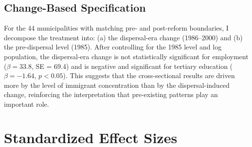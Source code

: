 \documentclass[12pt]{article}
\begin{document}
\subsection{Change-Based Specification}

For the 44 municipalities with matching pre- and post-reform boundaries, I decompose the treatment into: (a) the dispersal-era change (1986--2000) and (b) the pre-dispersal level (1985). After controlling for the 1985 level and log population, the dispersal-era change is not statistically significant for employment ($\beta = 33.8$, SE = 69.4) and is negative and significant for tertiary education ($\beta = -1.64$, $p < 0.05$). This suggests that the cross-sectional results are driven more by the level of immigrant concentration than by the dispersal-induced change, reinforcing the interpretation that pre-existing patterns play an important role.

\section{Standardized Effect Sizes}
\label{sec:sde}


\end{document}

